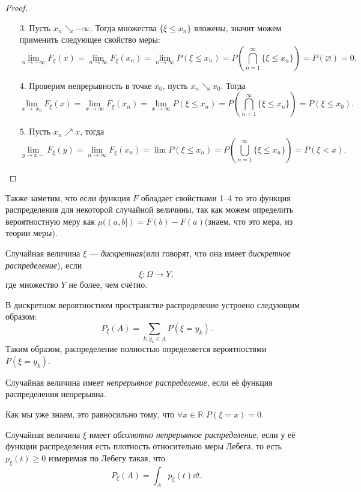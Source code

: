  \begin{proof}
 \enewline
    \begin{enumerate}
    \item[3.] Пусть $x_n\searrow -\infty$. Тогда множества $\{\xi \le x_n\}$ вложены, значит можем применить следующее свойство меры:
    $$\lim_{n\rightarrow -\infty} F_\xi (x) = \lim_{n \to \infty} F_{\xi}(x_n) = \underset{n\rightarrow \infty}{\lim} P(\xi\le x_n) = P \left(\overset{\infty}{\underset{n = 1}{\bigcap}} \{\xi\le x_n\}\right) = P(\varnothing) = 0.$$
    \item[4.]Проверим непрерывность в точке $x_0$, пусть $x_n\searrow x_0$.
                   Тогда 
                   $$\lim_{x \to \ x_0} F_\xi(x) = \underset{x\rightarrow\infty}{\lim} F_\xi (x_n)= \underset{x\rightarrow\infty}{\lim} P(\xi \le x_n) =
                       P\left(\overset{\infty}{\underset{n = 1}{\bigcap}} \{ \xi\le x_n\}\right) = P(\xi\le x_0).$$
    \item[5.] Пусть $x_n \nearrow x$, тогда
    $$\lim_{y\rightarrow x-} F_\xi(y)= \lim_{n \to \infty} F_\xi(x_n) = \lim P(\xi\le x_n) = P\left(\overset{\infty}{\underset{n = 1}{\bigcup}} \{\xi\le x_n\}\right) = P(\xi < x).$$ \qedhere
    \end{enumerate}
 \end{proof}
    
    Также заметим, что если функция $F$ обладает свойствами 1--4 то это функция распределения для некоторой случайной величины, так как можем определить вероятностную меру как $\mu((a, b]) = F(b) - F(a)$(знаем, что это мера, из теории меры).


 \begin{definition}
    Случайная величина $\xi$ --- \textit{дискретная}(или говорят, что она имеет \textit{дискретное распределение}), если
     $$\xi \colon \Omega \rightarrow Y,$$
     где множество $Y$ не более, чем счётно.
 \end{definition}
В дискретном вероятностном пространстве распределение устроено следующим образом:
  $$P_\xi(A) = \underset{k: y_k\in A}{\sum} P(\xi = y_k).$$
  Таким образом, распределение полностью определяется вероятностями $P(\xi = y_k)$.

 \begin{definition}Случайная величина имеет \textit{непрерывное распределение}, если её функция распределения непрерывна.
 \end{definition}
Как мы уже знаем, это равносильно тому, что  $\forall x\in\mathbb{R}$  $P(\xi = x) = 0$.
 \begin{definition}Случайная величина $\xi$ имеет \textit{абсолютно непрерывное распределение}, если у её функции распределения есть плотность относительно меры Лебега, то есть $p_\xi (t) \ge 0$ измеримая по Лебегу такая, что
     $$P_\xi(A) = \int_A p_\xi(t)\dd t.$$
 \end{definition}
 
